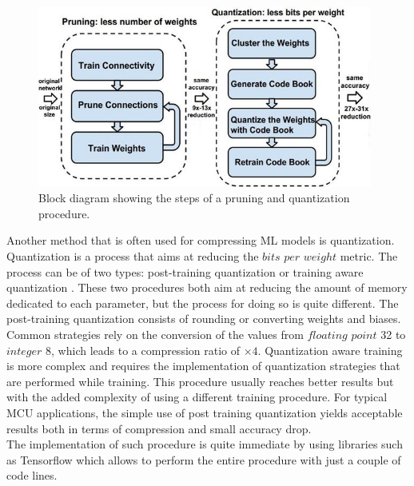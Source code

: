 \documentclass[12pt]{report}
\newcommand\blankpage{%
    \null
    \thispagestyle{empty}%
    \addtocounter{page}{0}%
    \newpage}
\begin{document}
\begin{figure}[h!]
    \centering
    \includegraphics[width=110mm]{Figures/Chapter1/pruning.jpg} 
    \caption{Block diagram showing the steps of a pruning and quantization procedure.}
    \label{fig:pruning}    
\end{figure}  

Another method that is often used for compressing ML models is quantization. Quantization is a process that aims at reducing the $bits$ $per$ $weight$ metric. The process can be of two types: post-training quantization or training aware quantization \cite{pruning_article}. These two procedures both aim at reducing the amount of memory dedicated to each parameter, but the process for doing so is quite different. The post-training quantization consists of rounding or converting weights and biases. Common strategies rely on the conversion of the values from $floating$ $point$ 32 to $integer$ 8, which leads to a compression ratio of $\times 4$. Quantization aware training is more complex and requires the implementation of quantization strategies that are performed while training. This procedure usually reaches better results but with the added complexity of using a different training procedure. For typical MCU applications, the simple use of post training quantization yields acceptable results both in terms of compression and small accuracy drop. \\
The implementation of such procedure is quite immediate by using libraries such as Tensorflow \cite{tensorflow_quantization} which allows to perform the entire procedure with just a couple of code lines.

\afterpage{\blankpage}
\end{document}
